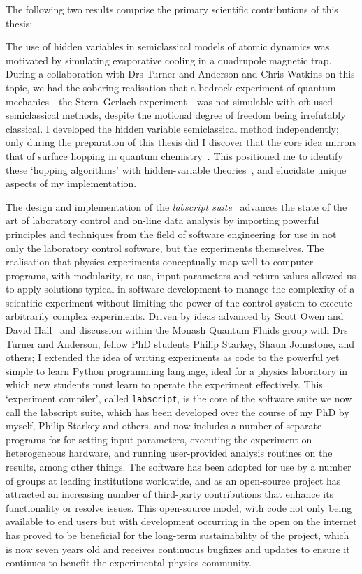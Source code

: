The following two results comprise the primary scientific contributions of this thesis:

The use of hidden variables in semiclassical models of atomic dynamics was motivated by simulating evaporative cooling in a quadrupole magnetic trap. During a collaboration with Drs Turner and Anderson and Chris Watkins on this topic, we had the sobering realisation that a bedrock experiment of quantum mechanics---the Stern--Gerlach experiment---was not simulable with oft-used semiclassical methods, despite the motional degree of freedom being irrefutably classical. I developed the hidden variable semiclassical method independently; only during the preparation of this thesis did I discover that the core idea mirrors that of surface hopping in quantum chemistry~\cite{doi:10.1063/1.459170}. This positioned me to identify these `hopping algorithms' with hidden-variable theories~\cite{PhysRevA.71.032325}, and elucidate unique aspects of my implementation.

The design and implementation of the \emph{labscript suite}~\cite{starkey_scripted_2013} advances the state of the art of laboratory control and on-line data analysis by importing powerful principles and techniques from the field of software engineering for use in not only the laboratory control software, but the experiments themselves. The realisation that physics experiments conceptually map well to computer programs, with modularity, re-use, input parameters and return values allowed us to apply solutions typical in software development to manage the complexity of a scientific experiment without limiting the power of the control system to execute arbitrarily complex experiments. Driven by ideas advanced by Scott Owen and David Hall~\cite{owen_fast_2003} and discussion within the Monash Quantum Fluids group with Drs Turner and Anderson, fellow PhD students Philip Starkey, Shaun Johnstone, and others; I extended the idea of writing experiments as code to the powerful yet simple to learn Python programming language, ideal for a physics laboratory in which new students must learn to operate the experiment effectively. This `experiment compiler', called \texttt{labscript}, is the core of the software suite we now call the labscript suite, which has been developed over the course of my PhD by myself, Philip Starkey and others, and now includes a number of separate programs for for setting input parameters, executing the experiment on heterogeneous hardware, and running user-provided analysis routines on the results, among other things. The software has been adopted for use by a number of groups at leading institutions worldwide, and as an open-source project has attracted an increasing number of third-party contributions that enhance its functionality or resolve issues. This open-source model, with code not only being available to end users but with development occurring in the open on the internet has proved to be beneficial for the long-term sustainability of the project, which is now seven years old and receives continuous bugfixes and updates to ensure it continues to benefit the experimental physics community.

